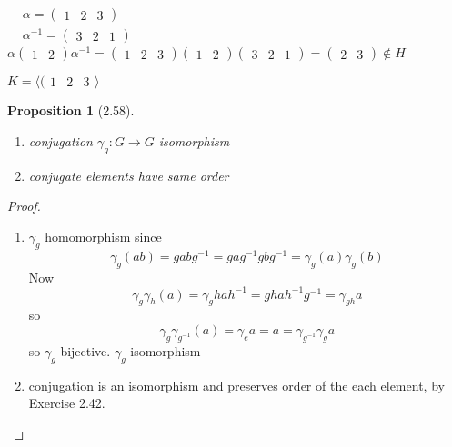 \documentclass[twoside,landscape]{amsart}
\theoremstyle{plain}
\newtheorem{proposition}{Proposition}
\theoremstyle{definition}
\theoremstyle{remark}
\begin{document}
\begin{multicols*}{2}
$\begin{aligned} & \quad \\ & \alpha = (\begin{matrix} 1 & 2 & 3 \end{matrix} ) \\ 
  & \alpha^{-1} = ( \begin{matrix} 3 & 2 & 1 \end{matrix} ) \end{aligned}$ \quad \quad $\alpha ( \begin{matrix} 1 & 2 \end{matrix} ) \alpha^{-1} = ( \begin{matrix} 1 & 2 & 3  \end{matrix} )( \begin{matrix} 1 & 2 \end{matrix} ) ( \begin{matrix} 3 & 2 & 1 \end{matrix} ) = ( \begin{matrix} 2 & 3 \end{matrix} ) \notin H$


$K = \langle ( \begin{matrix} 1 & 2 & 3 \end{matrix} \rangle$


\begin{proposition}[2.58]
  \begin{enumerate}
\item[(i)] conjugation $\gamma_g : G \to G$ isomorphism
\item[(ii)] conjugate elements have same order
\end{enumerate}
\end{proposition}

\begin{proof}
  \begin{enumerate}
\item[(i)] $\gamma_g$  homomorphism since 
\[
\gamma_g(ab) = gabg^{-1} = gag^{-1} gbg^{-1} = \gamma_g(a) \gamma_g(b)
\]
Now 
\[
\gamma_g \gamma_h(a) = \gamma_g hah^{-1} = gh ah^{-1} g^{-1} = \gamma_{gh} a
\]
so 
\[
\gamma_g \gamma_{g^{-1}} (a) = \gamma_e a = a = \gamma_{g^{-1}} \gamma_g a
\]
so $\gamma_g$ bijective.  $\gamma_g$ isomorphism
\item[(ii)] conjugation is an isomorphism and preserves order of the each element, by Exercise 2.42.  
\end{enumerate}
\end{proof}



\end{multicols*}
\end{document}
